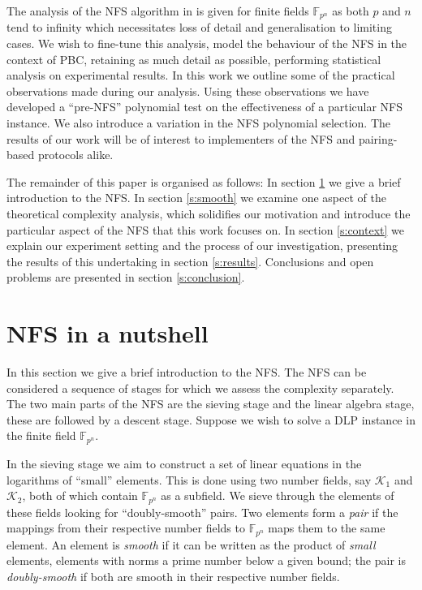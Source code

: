 \documentclass[a4paper, 12pt, envcountsect, runningheads]{llncs}
\newcommand{\F}{{\mathbb F}}
\numberwithin{figure}{section}
\numberwithin{equation}{section}
\begin{document}
The analysis of the NFS algorithm in \cite{joux-lercier-smart-vercauteren06} is given for finite fields $\F_{p^n}$ as both $p$ and $n$ tend to infinity which necessitates loss of detail and generalisation to limiting cases. We wish to fine-tune this analysis, model the behaviour of the NFS in the context of  PBC, retaining as much detail as possible, performing statistical analysis on experimental results. In this work we outline some of the practical observations made during our analysis. Using these observations we have developed a ``pre-NFS'' polynomial test on the effectiveness of a particular NFS instance. We also introduce a variation in the NFS polynomial selection. The results of our work will be of interest to implementers of the NFS and pairing-based protocols alike. 

The remainder of this paper is organised as follows: In section \ref{s:nfs} we give a brief introduction to the NFS. In section \ref{s:smooth} we examine one aspect of the theoretical complexity analysis, which solidifies our motivation and introduce the particular aspect of the NFS that this work focuses on. In section \ref{s:context} we explain our experiment setting and the process of our investigation, presenting the results of this undertaking in section \ref{s:results}. Conclusions and open problems are presented in section \ref{s:conclusion}.

\section{NFS in a nutshell} 
\label{s:nfs}
In this section we give a brief introduction to the NFS. The NFS can be considered a sequence of stages for which we assess the complexity separately. The two main parts of the NFS are the sieving stage and the linear algebra stage, these are followed by a descent stage. Suppose we wish to solve a DLP instance in the finite field $\F_{p^n}.$

In the sieving stage we aim to construct a set of linear equations in the logarithms of ``small'' elements. This is done using two number fields, say $\mathcal{K}_{1}$ and $\mathcal{K}_{2}$, both of which contain $\F_{p^n}$ as a subfield. We sieve through the elements of these fields looking for ``doubly-smooth'' pairs. Two elements form a {\em pair} if the mappings from their respective number fields to $\F_{p^n}$ maps them to the same element. An element is {\em smooth} if it can be written as the product of {\em small} elements, elements with norms a prime number below a given bound; the pair is {\em doubly-smooth} if both are smooth in their respective number fields. 
\end{document}
